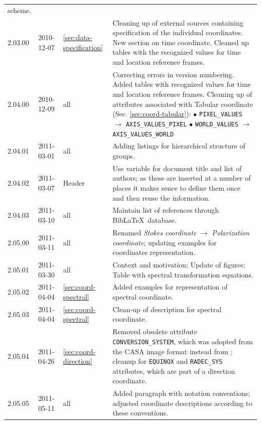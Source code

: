 \documentclass[a4paper,10pt,bibtotoc]{scrreprt}
\begin{document}
\begin{center}
\begin{supertabular}{lllp{10cm}}
    scheme. \\
    2.03.00 & 2010-12-07 & \ref{sec:data-specification} & Cleaning up
    of external sources containing specification of the individual
    coordinates. New section on time coordinate. Cleaned up tables
    with the recognized values for time and location reference
    frames. \\
    2.04.00 & 2010-12-09 & all & Correcting errors in version
    numbering. Added tables with recognized values for time and
    location reference frames. Cleaning up of attributes associated
    with Tabular coordinate (Sec. \ref{sec:coord-tabular}): \newline 
    $\bullet$ \verb|PIXEL_VALUES| $\rightarrow$ \verb|AXIS_VALUES_PIXEL|
    \newline
    $\bullet$ \verb|WORLD_VALUES| $\rightarrow$
    \verb|AXIS_VALUES_WORLD| \\
    2.04.01 & 2011-03-01 & all & Adding listings for hierarchical
    structure of groups. \\
    2.04.02 & 2011-03-07 & Header & Use variable for document
    title and list of authors; as these are inserted at a number of
    places it makes sence to define them once and then reuse the
    information. \\
    2.04.03 & 2011-03-10 & all & Maintain list of references
    through Bib\LaTeX\ database. \\
    2.05.00 & 2011-03-11 & all & Renamed \textsl{Stokes coordinate}
    $\rightarrow$ \textsl{Polarization coordinate}; updating examples
    for coordinates representation.  \\
    2.05.01 & 2011-03-30 & all & Context and motivation; Update of
    figures; Table with spectral transformation equations. \\
    2.05.02 & 2011-04-04 & \ref{sec:coord-spectral} & Added examples
    for representation of spectral coordinate. \\
    2.05.03 & 2011-04-04 & \ref{sec:coord-spectral} & Clean-up of
    description for spectral coordinate. \\
    2.05.04 & 2011-04-26 & \ref{sec:coord-direction} & Removed obsolete attribute
    \verb|CONVERSION_SYSTEM|, which was adopted from the CASA image
    format instead from \cite{fits.paper2}; cleanup for \verb|EQUINOX|
    and \verb|RADEC_SYS| attributes, which are part of a direction coordinate. \\
    2.05.05 & 2011-05-11 & all & Added paragraph with notation
    conventions; adjusted coordinate descriptions according to these conventions. \\

\end{supertabular}
\end{center}
\end{document}
